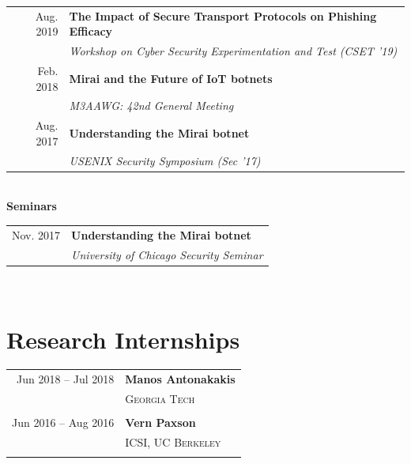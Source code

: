 \documentclass[10pt,singlecolumn]{article} %
\begin{document}
\begin{tabular}{rl}
Aug. 2019 & \textbf{The Impact of Secure Transport Protocols on Phishing Efficacy} \\
& \emph{Workshop on Cyber Security Experimentation and Test (CSET '19)} \\
Feb. 2018 & \textbf{Mirai and the Future of IoT botnets}\\
& \emph{M3AAWG: 42nd General Meeting} \\ 
Aug. 2017 & \textbf{Understanding the Mirai botnet} \\
& \emph{USENIX Security Symposium (Sec '17)} \\ 
\end{tabular} \\

\vspace{0.3cm}
\textbf{Seminars}\\

\begin{tabular}{rl}
Nov. 2017 & \textbf{Understanding the Mirai botnet}\\
& \emph{University of Chicago Security Seminar}\\
\end{tabular} \\




\section{Research Internships} 

\begin{tabular}{rl}
Jun 2018 -- Jul 2018 & \textbf{Manos Antonakakis}\\
& \textsc{Georgia Tech}\\
&\\

Jun 2016 -- Aug 2016 & \textbf{Vern Paxson}\\
& \textsc{ICSI, UC Berkeley}\\
& \\

\end{tabular}


%
%	
	
\end{document}

